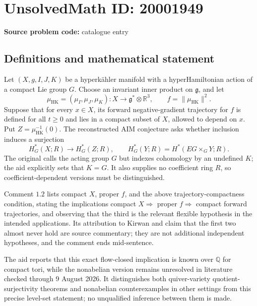 \documentclass[11pt]{article}
\newcommand{\Q}{\mathbb{Q}}
\newcommand{\R}{\mathbb{R}}
\begin{document}
\section*{UnsolvedMath ID: 20001949}
\textbf{Source problem code:} catalogue entry
\subsection{Definitions and mathematical statement}
Let \((X,g,I,J,K)\) be a hyperk\"ahler manifold with a hyperHamiltonian action of a compact Lie group \(G\). Choose an invariant inner product on \(\mathfrak g\), and let
\[
 \mu_{\mathrm{HK}}=(\mu_I,\mu_J,\mu_K):X\to\mathfrak g^*\otimes\R^3,
 \qquad f=\|\mu_{\mathrm{HK}}\|^2.
\]
Suppose that for every \(x\in X\), its forward negative-gradient trajectory for \(f\) is defined for all \(t\geq0\) and lies in a compact subset of \(X\), allowed to depend on \(x\). Put \(Z=\mu_{\mathrm{HK}}^{-1}(0)\). The reconstructed AIM conjecture asks whether inclusion induces a surjection
\[
 H_G^*(X;R)\longrightarrow H_G^*(Z;R),
 \qquad H_G^*(Y;R)=H^*(EG\times_GY;R).
\]
The original calls the acting group \(G\) but indexes cohomology by an undefined \(K\); the aid explicitly sets that \(K=G\). It also supplies no coefficient ring \(R\), so coefficient-dependent versions must be distinguished.

Comment \(1.2\) lists compact \(X\), proper \(f\), and the above trajectory-compactness condition, stating the implications compact \(X\Rightarrow\) proper \(f\Rightarrow\) compact forward trajectories, and observing that the third is the relevant flexible hypothesis in the intended applications. Its attribution to Kirwan and claim that the first two almost never hold are source commentary; they are not additional independent hypotheses, and the comment ends mid-sentence.

The aid reports that this exact flow-closed implication is known over \(\Q\) for compact tori, while the nonabelian version remains unresolved in literature checked through 9 August 2026. It distinguishes both quiver-variety quotient-surjectivity theorems and nonabelian counterexamples in other settings from this precise level-set statement; no unqualified inference between them is made.
\end{document}
